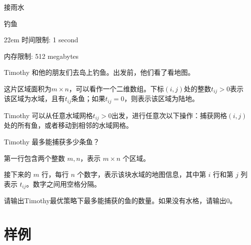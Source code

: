 \documentclass{xcpczh}
\begin{document}
\begin{problem}{接雨水}
	\end{problem}
	
	\begin{problem}{钓鱼}
		\begin{boxedminipage}[c][1.5cm][t]{22em} 
			时间限制: 1 second
			
			内存限制: 512 megabytes
		\end{boxedminipage}
		
		Timothy 和他的朋友们去岛上钓鱼。出发前，他们看了看地图。
		
		这片区域面积为$m \times n$，可以看作一个二维数组。下标$(i, j)$处的整数$t_{ij}>0$表示该区域为水域，且有$t_{ij}$条鱼；如果$t_{ij}=0$，则表示该区域为陆地。
		
		Timothy 可以从任意水域网格$t_{ij}>0$出发，进行任意次以下操作：捕获网格$(i, j)$处的所有鱼，或者移动到相邻的水域网格。
		
		Timothy 最多能捕获多少条鱼？
		
		
		\begin{inputdes}
			第一行包含两个整数 $m,n$，表示 $m\times n$ 个区域。
			
			接下来的 $m$ 行，每行 $n$ 个数字，表示该块水域的地图信息，其中第 $i$ 行和第 $j$ 列表示 $t_{ij}$。数字之间用空格分隔。
		\end{inputdes}
		
		\begin{outputdes}
			请输出Timothy最优策略下最多能捕获的鱼的数量。如果没有水格，请输出0。
		\end{outputdes}
		
		\section*{样例}
		

\end{problem}
\end{document}
